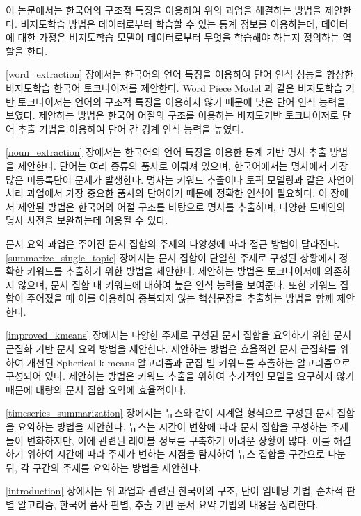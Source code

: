 \documentclass[oneside, ko,phd]{snuthesis_utf8_kor}
\begin{document}
이 논문에서는 한국어의 구조적 특징을 이용하여 위의 과업을 해결하는 방법을 제안한다.
비지도학습 방법은 데이터로부터 학습할 수 있는 통계 정보를 이용하는데, 데이터에 대한 가정은 비지도학습 모델이 데이터로부터 무엇을 학습해야 하는지 정의하는 역할을 한다.

\ref{word_extraction} 장에서는 한국어의 언어 특징을 이용하여 단어 인식 성능을 향상한 비지도학습 한국어 토크나이저를 제안한다.
Word Piece Model 과 같은 비지도학습 기반 토크나이저는 언어의 구조적 특징을 이용하지 않기 때문에 낮은 단어 인식 능력을 보였다.
제안하는 방법은 한국어 어절의 구조를 이용하는 비지도기반 토크나이저로 단어 추출 기법을 이용하여 단어 간 경계 인식 능력을 높였다.

\ref{noun_extraction} 장에서는 한국어의 언어 특징을 이용한 통계 기반 명사 추출 방법을 제안한다.
단어는 여러 종류의 품사로 이뤄져 있으며, 한국어에서는 명사에서 가장 많은 미등록단어 문제가 발생한다.
명사는 키워드 추출이나 토픽 모델링과 같은 자연어처리 과업에서 가장 중요한 품사의 단어이기 때문에 정확한 인식이 필요하다.
이 장에서 제안된 방법은 한국어의 어절 구조를 바탕으로 명사를 추출하며, 다양한 도메인의 명사 사전을 보완하는데 이용될 수 있다.

문서 요약 과업은 주어진 문서 집합의 주제의 다양성에 따라 접근 방법이 달라진다.
\ref{summarize_single_topic} 장에서는 문서 집합이 단일한 주제로 구성된 상황에서 정확한 키워드를 추출하기 위한 방법을 제안한다.
제안하는 방법은 토크나이저에 의존하지 않으며, 문서 집합 내 키워드에 대하여 높은 인식 능력을 보여준다.
또한 키워드 집합이 주어졌을 때 이를 이용하여 중복되지 않는 핵심문장을 추출하는 방법을 함께 제안한다.

\ref{improved_kmeans} 장에서는 다양한 주제로 구성된 문서 집합을 요약하기 위한 문서 군집화 기반 문서 요약 방법을 제안한다.
제안하는 방법은 효율적인 문서 군집화를 위하여 개선된 Spherical k-means 알고리즘과 군집 별 키워드를 추출하는 알고리즘으로 구성되어 있다.
제안하는 방법은 키워드 추출을 위하여 추가적인 모델을 요구하지 않기 때문에 대량의 문서 집합 요약에 효율적이다.

\ref{timeseries_summarization} 장에서는 뉴스와 같이 시계열 형식으로 구성된 문서 집합을 요약하는 방법을 제안한다.
뉴스는 시간이 변함에 따라 문서 집합을 구성하는 주제들이 변화하지만, 이에 관련된 레이블 정보를 구축하기 어려운 상황이 많다.
이를 해결하기 위하여 시간에 따라 주제가 변하는 시점을 탐지하여 뉴스 집합을 구간으로 나눈 뒤, 각 구간의 주제를 요약하는 방법을 제안한다.

\ref{introduction} 장에서는 위 과업과 관련된 한국어의 구조, 단어 임베딩 기법, 순차적 판별 알고리즘, 한국어 품사 판별, 추출 기반 문서 요약 기법의 내용을 정리한다.
\end{document}
